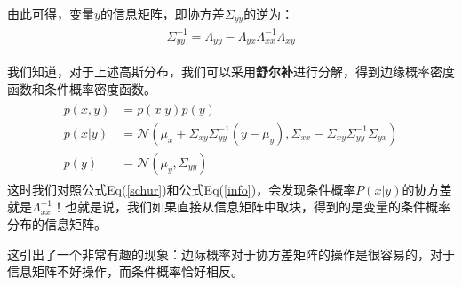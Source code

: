 \documentclass[a4pape,oneside,10pt]{article}
\begin{document}
由此可得，变量$y$的信息矩阵，即协方差$\Sigma_{yy}$的逆为：
\begin{equation}
    \label{info}
    \begin{split}
        \begin{aligned}
    \Sigma_{yy}^{-1} = \textbf{$\varLambda_{yy} - \varLambda_{yx}\varLambda_{xx}^{-1}\varLambda_{xy}$}
\end{aligned}
\end{split}
\end{equation}

我们知道，对于上述高斯分布，我们可以采用\textbf{舒尔补}进行分解，得到边缘概率密度函数和条件概率密度函数。
\begin{equation}
\label{schur}
\begin{split}
\begin{aligned}
    p(x,y) &= p(x|y)p(y) \\
    p(x|y) &= \mathcal{N}(\mu_x + \Sigma_{xy}\Sigma_{yy}^{-1}(y-\mu_y), \Sigma_{xx} - \Sigma_{xy}\Sigma_{yy}^{-1}\Sigma_{yx}) \\
    p(y) &= \mathcal{N} (\mu_y, \Sigma_{yy})
\end{aligned}
\end{split}
\end{equation}
这时我们对照公式Eq(\ref{schur})和公式Eq(\ref{info})，会发现条件概率$P(x|y)$的协方差就是$\varLambda_{xx}^{-1}$！也就是说，我们如果直接从信息矩阵中取块，得到的是变量的条件概率分布的信息矩阵。

这引出了一个非常有趣的现象：边际概率对于协方差矩阵的操作是很容易的，对于信息矩阵不好操作，而条件概率恰好相反。
\end{document}
